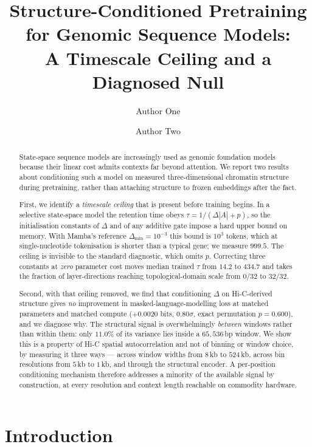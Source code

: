 \documentclass[10pt]{article}
\title{\bf Structure-Conditioned Pretraining for Genomic Sequence Models:\\
A Timescale Ceiling and a Diagnosed Null}
\author[ ]{Author One}
\author[ ]{Author Two}
\affil[ ]{\small Affiliation\\\texttt{\{a.one, a.two\}@institution.edu}}
\date{}
\begin{document}
\maketitle

\begin{abstract}
\noindent
State-space sequence models are increasingly used as genomic foundation models
because their linear cost admits contexts far beyond attention. We report two
results about conditioning such a model on measured three-dimensional chromatin
structure during pretraining, rather than attaching structure to frozen
embeddings after the fact.

First, we identify a \emph{timescale ceiling} that is present before training
begins. In a selective state-space model the retention time obeys
$\tau = 1/(\Delta|A| + p)$, so the initialisation constants of $\Delta$ and of
any additive gate impose a hard upper bound on memory. With Mamba's reference
$\Delta_{\min} = 10^{-3}$ this bound is $10^{3}$ tokens, which at
single-nucleotide tokenisation is shorter than a typical gene; we measure
$999.5$. The ceiling is invisible to the standard diagnostic, which omits $p$.
Correcting three constants at \emph{zero} parameter cost moves median trained
$\tau$ from $14.2$ to $434.7$ and takes the fraction of layer-directions
reaching topological-domain scale from $0/32$ to $32/32$.

Second, with that ceiling removed, we find that conditioning $\Delta$ on
Hi-C-derived structure gives \emph{no} improvement in masked-language-modelling
loss at matched parameters and matched compute ($+0.0020$ bits, $0.80\sigma$,
exact permutation $p = 0.600$), and we diagnose why. The structural signal is
overwhelmingly \emph{between} windows rather than within them: only $11.0\%$ of
its variance lies inside a $65{,}536$\,bp window. We show this is a property of
Hi-C spatial autocorrelation and not of binning or window choice, by measuring
it three ways --- across window widths from $8$\,kb to $524$\,kb, across bin
resolutions from $5$\,kb to $1$\,kb, and through the structural encoder. A
per-position conditioning mechanism therefore addresses a minority of the
available signal by construction, at every resolution and context length
reachable on commodity hardware.
\end{abstract}

\section{Introduction}
\end{document}
